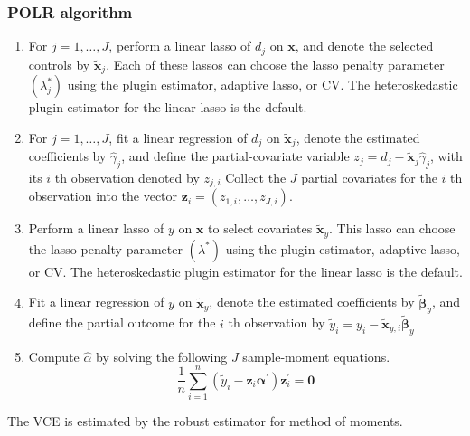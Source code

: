 {\subsubsection{POLR algorithm}
\begin{enumerate}
\item  For $j=1, \ldots, J$, perform a linear lasso of $d_{j}$ on $\mathbf{x}$, and denote the selected controls by $\widetilde{\mathbf{x}}_{j}$. Each of these lassos can choose the lasso penalty parameter $\left(\lambda_{j}^{*}\right)$ using the plugin estimator, adaptive lasso, or CV. The heteroskedastic plugin estimator for the linear lasso is the default.
\item  For $j=1, \ldots, J$, fit a linear regression of $d_{j}$ on $\widetilde{\mathbf{x}}_{j}$, denote the estimated coefficients by $\widehat{\gamma}_{j}$, and define the partial-covariate variable $z_{j}=d_{j}-\widetilde{\mathbf{x}}_{j} \widehat{\gamma}_{j}$, with its $i$ th observation denoted by $z_{j, i}$
Collect the $J$ partial covariates for the $i$ th observation into the vector $\mathbf{z}_{i}=\left(z_{1, i}, \ldots, z_{J, i}\right)$.
\item  Perform a linear lasso of $y$ on $\mathbf{x}$ to select covariates $\widetilde{\mathbf{x}}_{y}$.
This lasso can choose the lasso penalty parameter $\left(\lambda^{*}\right)$ using the plugin estimator, adaptive lasso, or CV. The heteroskedastic plugin estimator for the linear lasso is the default.
\item  Fit a linear regression of $y$ on $\widetilde{\mathbf{x}}_{y}$, denote the estimated coefficients by $\widetilde{\boldsymbol{\beta}}_{y}$, and define the partial outcome for the $i$ th observation by $\widetilde{y}_{i}=y_{i}-\widetilde{\mathbf{x}}_{y, i} \widetilde{\boldsymbol{\beta}}_{y}$
\item  Compute $\widehat{\alpha}$ by solving the following $J$ sample-moment equations.
$$
\frac{1}{n} \sum_{i=1}^{n}\left(\widetilde{y}_{i}-\mathbf{z}_{i} \boldsymbol{\alpha}^{\prime}\right) \mathbf{z}_{i}^{\prime}=\mathbf{0}
$$
\end{enumerate}
The VCE is estimated by the robust estimator for method of moments.


}
